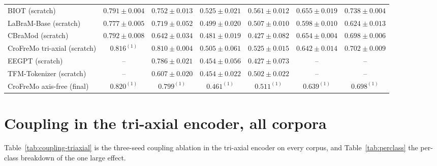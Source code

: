 \begin{table}[h]
\begin{tabular}{lcccccc}
BIOT (scratch) & $0.791 \pm 0.004$ & $0.752 \pm 0.013$ & $0.525 \pm 0.021$ & $0.561 \pm 0.012$ & $0.655 \pm 0.019$ & $0.738 \pm 0.004$ \\
LaBraM-Base (scratch) & $0.777 \pm 0.005$ & $0.719 \pm 0.052$ & $0.499 \pm 0.020$ & $0.507 \pm 0.010$ & $0.598 \pm 0.010$ & $0.624 \pm 0.013$ \\
CBraMod (scratch) & $0.792 \pm 0.008$ & $0.642 \pm 0.034$ & $0.481 \pm 0.019$ & $0.427 \pm 0.082$ & $0.654 \pm 0.004$ & $0.698 \pm 0.006$ \\
CroFreMo tri-axial (scratch) & $0.816^{(1)}$ & $0.810 \pm 0.004$ & $0.505 \pm 0.061$ & $0.525 \pm 0.015$ & $0.642 \pm 0.014$ & $0.702 \pm 0.009$ \\
EEGPT (scratch) & -- & $0.786 \pm 0.021$ & $0.454 \pm 0.056$ & $0.427 \pm 0.073$ & -- & -- \\
TFM-Tokenizer (scratch) & -- & $0.607 \pm 0.020$ & $0.454 \pm 0.022$ & $0.502 \pm 0.022$ & -- & -- \\
CroFreMo axis-free (final) & $0.820^{(1)}$ & $0.799^{(1)}$ & $0.461^{(1)}$ & $0.511^{(1)}$ & $0.639^{(1)}$ & $0.698^{(1)}$ \\
\bottomrule
\end{tabular}
\end{table}

\section{Coupling in the tri-axial encoder, all corpora}
\label{app:triaxial-coupling}

Table~\ref{tab:coupling-triaxial} is the three-seed coupling ablation in
the tri-axial encoder on every corpus, and Table~\ref{tab:perclass} the
per-class breakdown of the one large effect.

